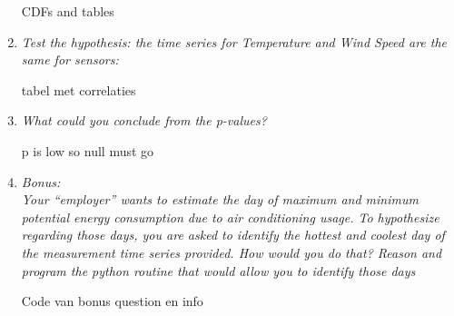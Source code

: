 \documentclass[a4paper,12pt]{article} %
\begin{document}
\begin{enumerate}
CDFs and tables 

\item {\it Test the hypothesis: the time series for Temperature and Wind Speed are the same for sensors:}

tabel met correlaties 

\item {\it What could you conclude from the p-values?}

p is low so null must go 

\item {\it Bonus:\\ Your “employer” wants to estimate the day of maximum and minimum potential energy consumption due to air conditioning usage. To hypothesize regarding those days, you are asked to identify the hottest and coolest day of the measurement time series provided. How would you do that? Reason and program the python routine that would allow you to identify those days}

Code van bonus question en info 



















\end{enumerate}
\end{document}
